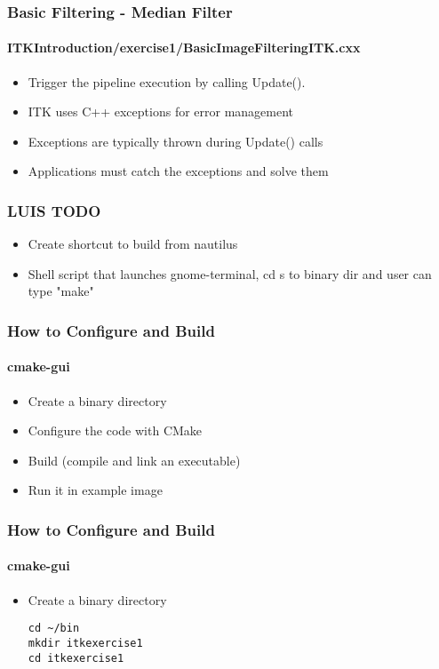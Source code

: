 {
\begin{frame}[fragile]
\frametitle{Basic Filtering - Median Filter}
\framesubtitle{ITKIntroduction/exercise1/BasicImageFilteringITK.cxx}
\begin{itemize}
\item Trigger the pipeline execution by calling Update().
\end{itemize}
\pause
\begin{itemize}
\item ITK uses C++ exceptions for error management
\item Exceptions are typically thrown during Update() calls
\item Applications must catch the exceptions and solve them
\end{itemize}
\end{frame}
}


\begin{frame}
\frametitle{LUIS TODO}
\begin{itemize}
\item Create shortcut to build from nautilus
\item Shell script that launches gnome-terminal, cd s to binary dir and user can type "make"
\end{itemize}
\end{frame}


\begin{frame}
\frametitle{How to Configure and Build}
\framesubtitle{cmake-gui}
\begin{itemize}
\item Create a binary directory
\item Configure the code with CMake
\item Build (compile and link an executable)
\item Run it in example image
\end{itemize}
\end{frame}

\begin{frame}[fragile]
\frametitle{How to Configure and Build}
\framesubtitle{cmake-gui}
\begin{itemize}
\item Create a binary directory
\begin{verbatim}
cd ~/bin
mkdir itkexercise1
cd itkexercise1
\end{verbatim}
\end{itemize}
\end{frame}

